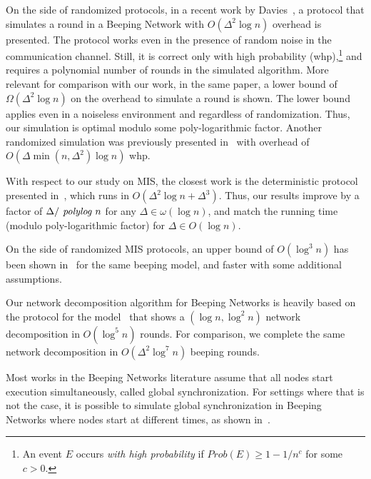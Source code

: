 On the side of randomized protocols, in a recent work by Davies~\cite{davies2023optimal}, a protocol that simulates a \congest round in a Beeping Network with $O(\Delta^2\log n)$ overhead is presented. The protocol works even in the presence of random noise in the communication channel. Still, it is correct only with high probability (whp),\footnote{An event $E$ occurs \emph{with high probability} if $Prob(E)\geq 1-1/n^c$ for some $c>0$.} and requires a polynomial number of \congest rounds in the simulated algorithm.   
More relevant for comparison with our work, in the same paper, a lower bound of $\Omega(\Delta^2 \log n)$ on the overhead to simulate a \congest round is shown. The lower bound applies even in a noiseless environment and regardless of randomization. 
Thus, our simulation is optimal modulo some poly-logarithmic factor. 
%
Another randomized simulation was previously presented in~\cite{ashkenazi2020brief} with overhead of $O(\Delta\min(n,\Delta^2)\log n)$ whp.



With respect to our study on MIS, the closest work is the deterministic protocol presented in~\cite{beauquier2018fast}, which runs in $O(\Delta^2 \log n + \Delta^3)$. Thus, our results improve by a factor of $\Delta/\text{\em\ polylog } n$ for any $\Delta\in \omega(\log n)$, and match the running time (modulo poly-logarithmic factor) for $\Delta\in O(\log n)$. 

On the side of randomized MIS protocols, an upper bound of $O(\log^3 n)$ has been shown in~\cite{afek2013beeping} for the same beeping model, and faster with some additional assumptions.

Our network decomposition algorithm for Beeping Networks is heavily based on the protocol for the \congest model~\cite{ghaffari2021improved} that shows a $(\log n, \log^2 n)$ network decomposition in $O(\log^5 n)$ \congest rounds. For comparison, we complete the same network decomposition in $O(\Delta^2 \log^7 n)$ beeping rounds.

Most works in the Beeping Networks literature assume that all nodes start execution simultaneously, called global synchronization. For settings where that is not the case, it is possible to simulate global synchronization in Beeping Networks where nodes start at different times, as shown in~\cite{afek2013beeping,forster2014deterministic,dufoulon2018beeping,hounkanli2020global}. 

